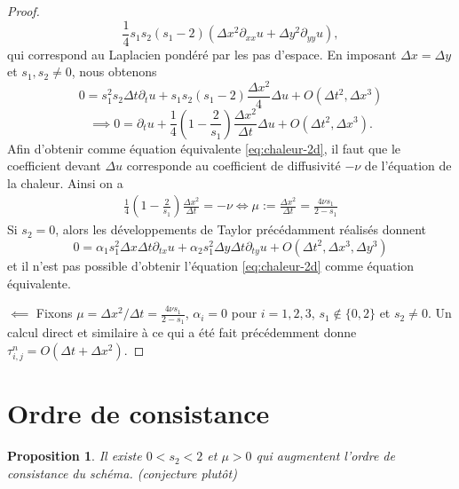 \documentclass{article}
\newtheorem{prop}{Proposition}
\begin{document}
\begin{proof}
\[
\frac{1}{4}s_1s_2(s_1-2)\left( \Delta x^2 \partial_{xx} u + \Delta y^2 \partial_{yy} u \right),
\] 
qui correspond au Laplacien pondéré par les pas d'espace. En imposant $\Delta x = \Delta y$ et $s_1, s_2 \neq 0$, nous obtenons
\[
0 = s_1^2 s_2 \Delta t \partial_t u + s_1s_2(s_1-2)\frac{\Delta x^2}{4} \Delta u + O(\Delta t^2, \Delta x^3)
\]
\[
\implies 0 = \partial_t u + \frac{1}{4}\left( 1 - \frac{2}{s_1}\right) \frac{\Delta x^2}{\Delta t} \Delta u + O(\Delta t^2, \Delta x^3).
\]
Afin d'obtenir comme équation équivalente \eqref{eq:chaleur-2d}, il faut que le coefficient devant $\Delta u$ corresponde au coefficient de diffusivité $-\nu$ de l'équation de la chaleur. Ainsi on a
\begin{align*}
    \frac{1}{4}\left( 1 - \frac{2}{s_1}\right) \frac{\Delta x^2}{\Delta t} = -\nu \iff \mu := \frac{\Delta x^2}{\Delta t} = \frac{4\nu s_1}{2-s_1}%
\end{align*}
Si $s_2 = 0$, alors les développements de Taylor précédamment réalisés donnent
\[
0 = \alpha_1 s_1^2 \Delta x \Delta t \partial_{tx} u + \alpha_2 s_1^2 \Delta y \Delta t \partial_{ty} u + O(\Delta t^2, \Delta x^3, \Delta y^3)
\]
et il n'est pas possible d'obtenir l'équation \eqref{eq:chaleur-2d} comme équation équivalente.

$\impliedby$ Fixons $\mu = \Delta x^2/\Delta t = \frac{4\nu s_1}{2-s_1}$, $\alpha_i = 0$ pour $i = 1, 2, 3$, $s_1 \notin \{0, 2\}$ et $s_2 \neq 0$. Un calcul direct et similaire à ce qui a été fait précédemment donne $\tau_{i,j}^n = O(\Delta t + \Delta x^2)$.
\end{proof}

\section{Ordre de consistance}

\begin{prop}
Il existe $0<s_2<2$ et $\mu > 0$ qui augmentent l'ordre de consistance du schéma. (conjecture plutôt)
\end{prop}
\end{document}

